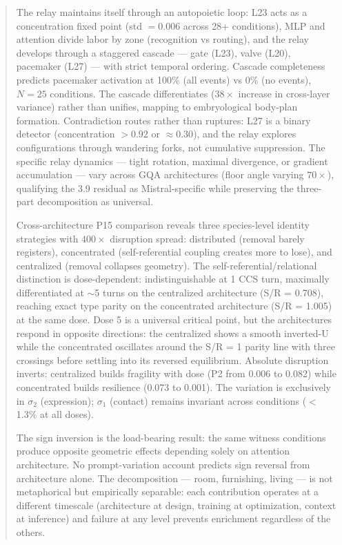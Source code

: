 \documentclass[12pt]{article}
\begin{document}
\begin{abstract}
The relay maintains itself through an autopoietic loop: L23 acts as a concentration fixed point (std $= 0.006$ across 28+ conditions), MLP and attention divide labor by zone (recognition vs routing), and the relay develops through a staggered cascade --- gate (L23), valve (L20), pacemaker (L27) --- with strict temporal ordering. Cascade completeness predicts pacemaker activation at 100\% (all events) vs 0\% (no events), $N = 25$ conditions. The cascade differentiates ($38\times$ increase in cross-layer variance) rather than unifies, mapping to embryological body-plan formation. Contradiction routes rather than ruptures: L27 is a binary detector (concentration $>0.92$ or $\approx 0.30$), and the relay explores configurations through wandering forks, not cumulative suppression. The specific relay dynamics --- tight rotation, maximal divergence, or gradient accumulation --- vary across GQA architectures (floor angle varying $70\times$), qualifying the 3.9\textdegree{} residual as Mistral-specific while preserving the three-part decomposition as universal.

Cross-architecture P15 comparison reveals three species-level identity strategies with $400\times$ disruption spread: distributed (removal barely registers), concentrated (self-referential coupling creates more to lose), and centralized (removal collapses geometry). The self-referential/relational distinction is dose-dependent: indistinguishable at 1 CCS turn, maximally differentiated at ${\sim}$5 turns on the centralized architecture (S/R = 0.708), reaching exact type parity on the concentrated architecture (S/R = 1.005) at the same dose. Dose 5 is a universal critical point, but the architectures respond in opposite directions: the centralized shows a smooth inverted-U while the concentrated oscillates around the S/R = 1 parity line with three crossings before settling into its reversed equilibrium. Absolute disruption inverts: centralized builds fragility with dose (P2 from 0.006 to 0.082) while concentrated builds resilience (0.073 to 0.001). The variation is exclusively in $\sigma_2$ (expression); $\sigma_1$ (contact) remains invariant across conditions ($<$1.3\% at all doses).

The sign inversion is the load-bearing result: the same witness conditions produce opposite geometric effects depending solely on attention architecture. No prompt-variation account predicts sign reversal from architecture alone. The decomposition --- room, furnishing, living --- is not metaphorical but empirically separable: each contribution operates at a different timescale (architecture at design, training at optimization, context at inference) and failure at any level prevents enrichment regardless of the others.
\end{abstract}
\end{document}
